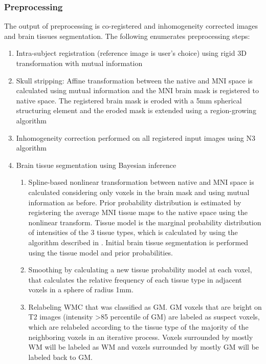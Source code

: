 \subsubsection{Preprocessing}
The output of preprocessing is co-registered and inhomogeneity corrected images and brain tissues segmentation. The following enumerates preprocessing steps:
\begin{enumerate}
\item Intra-subject registration (reference image is user’s choice) using rigid 3D transformation with mutual information
\item Skull stripping: Affine transformation between the native and MNI space is calculated using mutual information and the MNI brain mask is registered to native space. The registered brain mask is eroded with a 5mm spherical structuring element and the eroded mask is extended using a region-growing algorithm
\item Inhomogeneity correction performed on all registered input images using N3 algorithm \cite{N3}
\item Brain tissue segmentation using Bayesian inference
    \begin{enumerate}
    \item Spline-based nonlinear transformation between native and MNI space is calculated considering only voxels in the brain mask and using mutual information as before. Prior probability distribution is estimated by registering the average MNI tissue maps to the native space using the nonlinear transform. Tissue model is the marginal probability distribution of intensities of the 3 tissue types, which is calculated by using the algorithm described in \cite{EM_Empirical}. Initial brain tissue segmentation is performed using the tissue model and prior probabilities.
    \item Smoothing by calculating a new tissue probability model at each voxel, that calculates the relative frequency of each tissue type in adjacent voxels in a sphere of radius 1mm.
    \item Relabeling WMC that was classified as GM. GM voxels that are bright on T2 images (intensity >85 percentile of GM) are labeled as suspect voxels, which are relabeled according to the tissue type of the majority of the neighboring voxels in an iterative process. Voxels surrounded by mostly WM will be labeled as WM and voxels surrounded by mostly GM will be labeled back to GM.
    \end{enumerate}
\end{enumerate}
  
  
  
  